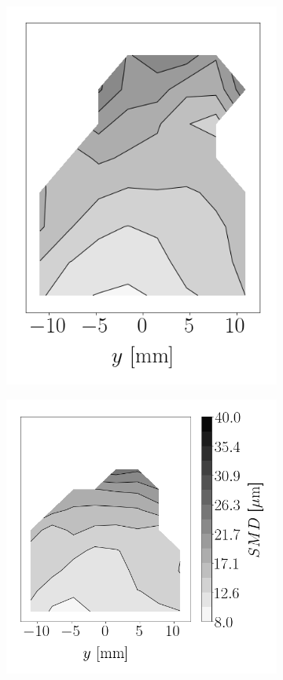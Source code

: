 \begin{figure}[h!]
\begin{subfigure}[b]{0.2\textwidth}
   \includegraphics[scale=0.4]{./part2_developments/figures_ch6_lagrangian_JICF/params_gaseous_initial_conditions/maps/no_ALM_SMD}
\end{subfigure}
\hspace*{0.00in}
\begin{subfigure}[b]{0.2\textwidth}
	\flushleft
   \includegraphics[scale=0.4]{./part2_developments/figures_ch6_lagrangian_JICF/params_gaseous_initial_conditions/maps/ALM_initial_SMD}
\end{subfigure}


\end{figure}
